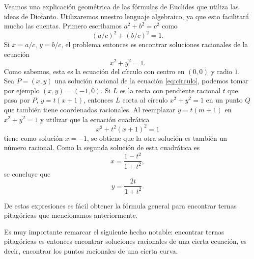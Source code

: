 Veamos una explicación geométrica de las fórmulas de Euclides que utiliza las
ideas de Diofanto. Utilizaremos nuestro lenguaje algebraico, ya que esto
facilitará mucho las cuentas.  Primero escribamos $a^2+b^2=c^2$ como
\[
	\left(a/c\right)^2+\left(b/c\right)^2=1.
\]
Si $x=a/c$, $y=b/c$, el problema entonces es encontrar soluciones racionales de 
la ecuación 
\begin{equation}
\label{eq:circulo}
	x^2+y^2=1.
\end{equation}
Como sabemos, esta es la ecuación del círculo con centro en $(0,0)$ y radio
$1$.  Sea $P=(x,y)$ una solución racional de la ecuación \eqref{eq:circulo}, 
podemos tomar por
ejemplo $(x,y)=(-1,0)$. Si $L$ es la recta con pendiente racional $t$ que pasa
por $P$, $y=t(x+1)$, entonces $L$ corta al círculo $x^2+y^2=1$ en un punto $Q$
que también tiene coordenadas racionales. Al reemplazar $y=t(m+1)$ en
$x^2+y^2=1$ y utilizar que la ecuación cuadrática
\[
	x^2+t^2(x+1)^2=1
\]
tiene como solución $x=-1$, se obtiene que la otra solución es también un
número racional. Como la segunda solución de esta cuadrática es
\[
	x=\frac{1-t^2}{1+t^2},
\]
se concluye que 
\[
	y=\frac{2t}{1+t^2}.
\]

De estas expresiones es fácil obtener la fórmula general para encontrar ternas
pitagóricas que mencionamos anteriormente. 

Es muy importante remarcar el siguiente hecho notable: encontrar ternas
pitagóricas es entonces encontrar soluciones racionales de una cierta ecuación, 
es decir, encontrar los puntos racionales de una cierta curva. 

